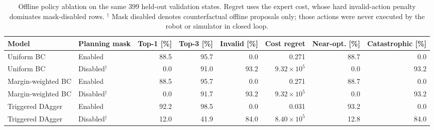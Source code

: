 \begin{table}[t]
\caption{Offline policy ablation on the same 399 held-out validation states. Regret uses the
expert cost, whose hard invalid-action penalty dominates mask-disabled rows. $^{\dagger}$ Mask
disabled denotes counterfactual offline proposals only; those actions were never executed by the
robot or simulator in closed loop.}
\label{tab:offline-ablation}
\centering
\footnotesize
\begin{tabular}{llrrrrrr}
\toprule
Model & Planning mask & Top-1 [\%] & Top-3 [\%] & Invalid [\%] & Cost regret
& Near-opt. [\%] & Catastrophic [\%] \\
\midrule
Uniform BC & Enabled & 88.5 & 95.7 & 0.0 & 0.271 & 88.7 & 0.0 \\
Uniform BC & Disabled$^{\dagger}$ & 0.0 & 91.0 & 93.2 & $9.32\times 10^{5}$ & 0.0 & 93.2 \\
Margin-weighted BC & Enabled & 88.5 & 95.7 & 0.0 & 0.271 & 88.7 & 0.0 \\
Margin-weighted BC & Disabled$^{\dagger}$ & 0.0 & 91.7 & 93.2 & $9.32\times 10^{5}$ & 0.0 & 93.2 \\
Triggered DAgger & Enabled & 92.2 & 98.5 & 0.0 & 0.031 & 93.2 & 0.0 \\
Triggered DAgger & Disabled$^{\dagger}$ & 12.0 & 41.9 & 84.0 & $8.40\times 10^{5}$ & 12.8 & 84.0 \\
\bottomrule
\end{tabular}
\end{table}

